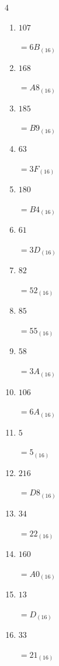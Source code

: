 \begin{multicols}{4}
\begin{enumerate}
  \item $107$

        $=6B_{(16)}$

  \item $168$

        $=A8_{(16)}$

  \item $185$

        $=B9_{(16)}$

  \item $63$

        $=3F_{(16)}$

  \item $180$

        $=B4_{(16)}$

  \item $61$

        $=3D_{(16)}$

  \item $82$

        $=52_{(16)}$

\columnbreak %

\resetques

  \item $85$

        $=55_{(16)}$

  \item $58$

        $=3A_{(16)}$

  \item $106$

        $=6A_{(16)}$

  \item $5$

        $=5_{(16)}$

  \item $216$

        $=D8_{(16)}$

  \item $34$

        $=22_{(16)}$

  \item $160$

        $=A0_{(16)}$

  \item $13$

        $=D_{(16)}$

  \item $33$

        $=21_{(16)}$


\end{enumerate}
\end{multicols}
